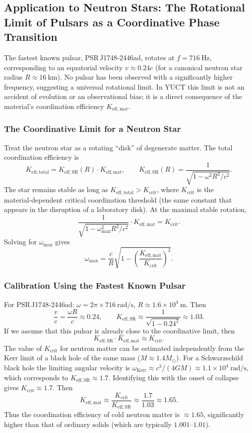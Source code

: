 \documentclass[12pt,a4paper]{article}
\begin{document}
	\subsection{Application to Neutron Stars: The Rotational Limit of Pulsars as a Coordinative Phase Transition}
	
	The fastest known pulsar, PSR J1748‑2446ad, rotates at \(f = 716\ \text{Hz}\), corresponding to an equatorial velocity \(v \approx 0.24c\) (for a canonical neutron star radius \(R\approx 16\ \text{km}\)). No pulsar has been observed with a significantly higher frequency, suggesting a universal rotational limit. In YUCT this limit is not an accident of evolution or an observational bias; it is a direct consequence of the material’s coordination efficiency \(K_{\mathrm{eff,mat}}\).
	
	\subsubsection{The Coordinative Limit for a Neutron Star}
	
	Treat the neutron star as a rotating “disk” of degenerate matter. The total coordination efficiency is
	\[
	K_{\mathrm{eff,total}} = K_{\mathrm{eff,SR}}(R) \cdot K_{\mathrm{eff,mat}},
	\qquad
	K_{\mathrm{eff,SR}}(R) = \frac{1}{\sqrt{1 - \omega^2 R^2/c^2}}.
	\]
	The star remains stable as long as \(K_{\mathrm{eff,total}} > K_{\mathrm{crit}}\), where \(K_{\mathrm{crit}}\) is the material‑dependent critical coordination threshold (the same constant that appears in the disruption of a laboratory disk). At the maximal stable rotation,
	\[
	\frac{1}{\sqrt{1 - \omega_{\max}^2 R^2/c^2}} \cdot K_{\mathrm{eff,mat}} = K_{\mathrm{crit}}.
	\]
	Solving for \(\omega_{\max}\) gives
	\[
	\omega_{\max} = \frac{c}{R}\sqrt{1 - \left(\frac{K_{\mathrm{eff,mat}}}{K_{\mathrm{crit}}}\right)^2}.
	\]
	
	\subsubsection{Calibration Using the Fastest Known Pulsar}
	
	For PSR J1748‑2446ad: \(\omega = 2\pi\times716\ \text{rad/s}\), \(R\approx 1.6\times10^4\ \text{m}\). Then
	\[
	\frac{v}{c} = \frac{\omega R}{c} \approx 0.24,\qquad
	K_{\mathrm{eff,SR}} \approx \frac{1}{\sqrt{1-0.24^2}} \approx 1.03.
	\]
	If we assume that this pulsar is already close to the coordinative limit, then
	\[
	K_{\mathrm{eff,SR}} \cdot K_{\mathrm{eff,mat}} \approx K_{\mathrm{crit}}.
	\]
	The value of \(K_{\mathrm{crit}}\) for neutron matter can be estimated independently from the Kerr limit of a black hole of the same mass (\(M\approx1.4M_\odot\)). For a Schwarzschild black hole the limiting angular velocity is \(\omega_{\text{Kerr}} \approx c^3/(4GM) \approx 1.1\times10^4\ \text{rad/s}\), which corresponds to \(K_{\mathrm{eff,SR}} \approx 1.7\). Identifying this with the onset of collapse gives \(K_{\mathrm{crit}} \approx 1.7\). Then
	\[
	K_{\mathrm{eff,mat}} \approx \frac{K_{\mathrm{crit}}}{K_{\mathrm{eff,SR}}} \approx \frac{1.7}{1.03} \approx 1.65.
	\]
	Thus the coordination efficiency of cold neutron matter is \(\approx 1.65\), significantly higher than that of ordinary solids (which are typically \(1.001\)–\(1.01\)).
	
\end{document}
